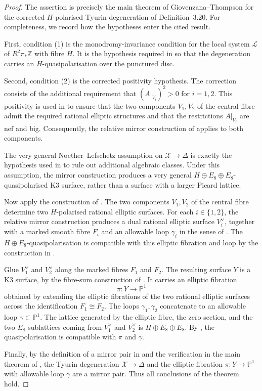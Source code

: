 \documentclass[11pt]{amsart}
\newcommand{\bP}{\mathbb{P}}
\newcommand{\bZ}{\mathbb{Z}}
\newcommand{\bD}{\Delta}
\newcommand{\cX}{\mathcal{X}}
\newcommand{\cL}{\mathcal{L}}
\begin{document}
\begin{proof}
The assertion is precisely the main theorem of Giovenzana--Thompson \cite[Main Theorem, \S5]{dfk3slpms} for the corrected \(H\)-polarised Tyurin degeneration of Definition~3.20. For completeness, we record how the hypotheses enter the cited result.

First, condition (1) is the monodromy-invariance condition for the local system \(\cL\) of \(R^2\pi_*\bZ\) with fibre \(H\). It is the hypothesis required in \cite[Definition 3.20]{dfk3slpms} so that the degeneration carries an \(H\)-quasipolarisation over the punctured disc.

Second, condition (2) is the corrected positivity hypothesis. The correction consists of the additional requirement that \((A|_{V_i})^2>0\) for \(i=1,2\). This positivity is used in \cite[\S4]{dfk3slpms} to ensure that the two components \(V_1,V_2\) of the central fibre admit the required rational elliptic structures and that the restrictions \(A|_{V_i}\) are nef and big. Consequently, the relative mirror construction of \cite[\S4]{dfk3slpms} applies to both components.

The very general Noether--Lefschetz assumption on \(\cX\to\bD\) is exactly the hypothesis used in \cite[\S5]{dfk3slpms} to rule out additional algebraic classes. Under this assumption, the mirror construction produces a very general \(H\oplus E_8\oplus E_8\)-quasipolarised K3 surface, rather than a surface with a larger Picard lattice.

Now apply the construction of \cite[\S4]{dfk3slpms}. The two components \(V_1,V_2\) of the central fibre determine two \(H\)-polarised rational elliptic surfaces. For each \(i\in\{1,2\}\), the relative mirror construction produces a dual rational elliptic surface \(V_i^\vee\), together with a marked smooth fibre \(F_i\) and an allowable loop \(\gamma_i\) in the sense of \cite[Definition 4.11]{dfk3slpms}. The \(H\oplus E_8\)-quasipolarisation is compatible with this elliptic fibration and loop by the construction in \cite[\S4]{dfk3slpms}.

Glue \(V_1^\vee\) and \(V_2^\vee\) along the marked fibres \(F_1\) and \(F_2\). The resulting surface \(Y\) is a K3 surface, by the fibre-sum construction of \cite[\S4]{dfk3slpms}. It carries an elliptic fibration
\[
\pi\colon Y\to \bP^1
\]
obtained by extending the elliptic fibrations of the two rational elliptic surfaces across the identification \(F_1\cong F_2\). The loops \(\gamma_1,\gamma_2\) concatenate to an allowable loop \(\gamma\subset\bP^1\). The lattice generated by the elliptic fibre, the zero section, and the two \(E_8\) sublattices coming from \(V_1^\vee\) and \(V_2^\vee\) is \(H\oplus E_8\oplus E_8\). By \cite[Definition 4.21 and \S4]{dfk3slpms}, the quasipolarisation is compatible with \(\pi\) and \(\gamma\).

Finally, by the definition of a mirror pair in \cite[Definition 5.1]{dfk3slpms} and the verification in the main theorem of \cite[\S5]{dfk3slpms}, the Tyurin degeneration \(\cX\to\bD\) and the elliptic fibration \(\pi\colon Y\to\bP^1\) with allowable loop \(\gamma\) are a mirror pair. Thus all conclusions of the theorem hold.
\end{proof}
\end{document}
